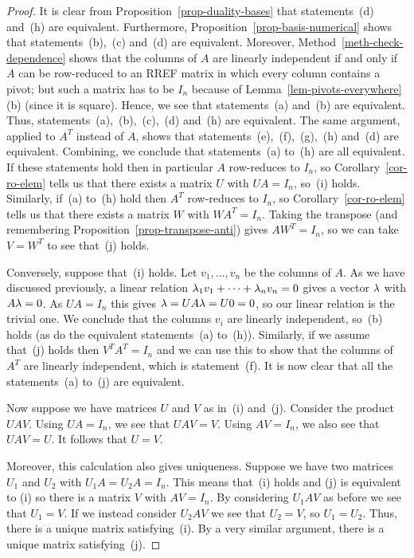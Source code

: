 \documentclass[reqno]{amsart}
\theoremstyle{definition}
\begin{document}
\begin{proof}
 It is clear from Proposition~\ref{prop-duality-bases}
 that statements~(d) and~(h) are equivalent.
 Furthermore, Proposition~\ref{prop-basis-numerical} shows
 that statements~(b),~(c) and~(d) are equivalent.
 Moreover, Method~\ref{meth-check-dependence} shows that
 the columns of $A$ are linearly independent if and only if
 $A$ can be row-reduced to an RREF matrix in which every
 column contains a pivot; but such a matrix has to be $I_n$
 because of Lemma~\ref{lem-pivots-everywhere} (b)
 (since it is square).
 Hence, we see that statements~(a) and~(b) are equivalent.
 Thus, statements~(a),~(b),~(c),~(d) and~(h) are equivalent.
 The same argument, applied to $A^T$ instead of $A$, shows
 that statements~(e),~(f),~(g),~(h) and~(d) are equivalent.
 Combining, we conclude that statements~(a) to~(h) are all
 equivalent.  If these statements hold then in particular $A$
 row-reduces to $I_n$, so Corollary~\ref{cor-ro-elem} tells us that
 there exists a matrix $U$ with $UA=I_n$, so~(i) holds.  Similarly,
 if~(a) to~(h) hold then $A^T$ row-reduces to $I_n$, so
 Corollary~\ref{cor-ro-elem} tells us that there exists a matrix $W$
 with $WA^T=I_n$.  Taking the transpose (and remembering
 Proposition~\ref{prop-transpose-anti}) gives $AW^T=I_n$, so we can
 take $V=W^T$ to see that~(j) holds.

 Conversely, suppose that~(i) holds.  Let $v_1,\dotsc,v_n$ be the
 columns of $A$.  As we have discussed previously, a linear relation
 $\lambda_1v_1+\dotsb+\lambda_nv_n=0$ gives a vector $\lambda$ with $A\lambda=0$.
 As $UA=I_n$ this gives $\lambda=UA\lambda=U0=0$, so our linear relation is
 the trivial one.  We conclude that the columns $v_i$ are linearly
 independent, so~(b) holds (as do the equivalent statements~(a)
 to~(h)).  Similarly, if we assume that~(j) holds then $V^TA^T=I_n$
 and we can use this to show that the columns of $A^T$ are linearly
 independent, which is statement~(f).  It is now clear that all the
 statements~(a) to~(j) are equivalent.

 Now suppose we have matrices $U$ and $V$ as in~(i) and~(j).  Consider
 the product $UAV$.  Using $UA=I_n$, we see that $UAV=V$.  Using
 $AV=I_n$, we also see that $UAV=U$.  It follows that $U=V$.

 Moreover, this calculation also gives uniqueness.  Suppose we have
 two matrices $U_1$ and $U_2$ with $U_1A=U_2A=I_n$.  This means
 that~(i) holds and (j) is equivalent to (i) so there is a matrix $V$
 with $AV=I_n$.  By considering $U_1AV$ as before we see that
 $U_1=V$.  If we instead consider $U_2AV$ we see that $U_2=V$, so
 $U_1=U_2$.  Thus, there is a unique matrix satisfying~(i).  By a very
 similar argument, there is a unique matrix satisfying~(j).
\end{proof}
\end{document}
